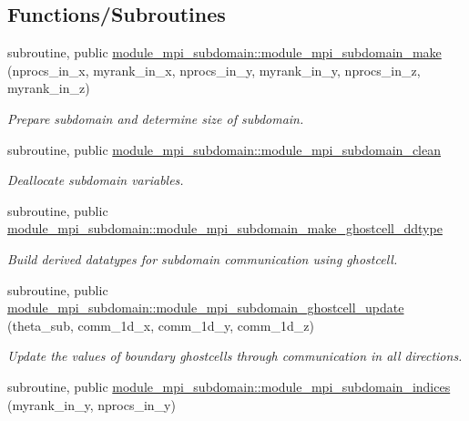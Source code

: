 \subsection*{Functions/\+Subroutines}
\begin{DoxyCompactItemize}
\item 
subroutine, public \mbox{\hyperlink{namespacemodule__mpi__subdomain_a6387e08f00a18fad06417aa9b51854ac}{module\+\_\+mpi\+\_\+subdomain\+::module\+\_\+mpi\+\_\+subdomain\+\_\+make}} (nprocs\+\_\+in\+\_\+x, myrank\+\_\+in\+\_\+x, nprocs\+\_\+in\+\_\+y, myrank\+\_\+in\+\_\+y, nprocs\+\_\+in\+\_\+z, myrank\+\_\+in\+\_\+z)
\begin{DoxyCompactList}\small\item\em Prepare subdomain and determine size of subdomain. \end{DoxyCompactList}\item 
subroutine, public \mbox{\hyperlink{namespacemodule__mpi__subdomain_ab1a550c72f16254a20785d7f4eae4e1c}{module\+\_\+mpi\+\_\+subdomain\+::module\+\_\+mpi\+\_\+subdomain\+\_\+clean}}
\begin{DoxyCompactList}\small\item\em Deallocate subdomain variables. \end{DoxyCompactList}\item 
subroutine, public \mbox{\hyperlink{namespacemodule__mpi__subdomain_a108c65cb0e549fd286b43243a6406ec9}{module\+\_\+mpi\+\_\+subdomain\+::module\+\_\+mpi\+\_\+subdomain\+\_\+make\+\_\+ghostcell\+\_\+ddtype}}
\begin{DoxyCompactList}\small\item\em Build derived datatypes for subdomain communication using ghostcell. \end{DoxyCompactList}\item 
subroutine, public \mbox{\hyperlink{namespacemodule__mpi__subdomain_a3e13201bdd812e62d2293bb0e2c2221d}{module\+\_\+mpi\+\_\+subdomain\+::module\+\_\+mpi\+\_\+subdomain\+\_\+ghostcell\+\_\+update}} (theta\+\_\+sub, comm\+\_\+1d\+\_\+x, comm\+\_\+1d\+\_\+y, comm\+\_\+1d\+\_\+z)
\begin{DoxyCompactList}\small\item\em Update the values of boundary ghostcells through communication in all directions. \end{DoxyCompactList}\item 
subroutine, public \mbox{\hyperlink{namespacemodule__mpi__subdomain_a407d55f604c25fca086515a66980f67b}{module\+\_\+mpi\+\_\+subdomain\+::module\+\_\+mpi\+\_\+subdomain\+\_\+indices}} (myrank\+\_\+in\+\_\+y, nprocs\+\_\+in\+\_\+y)

\end{DoxyCompactItemize}
